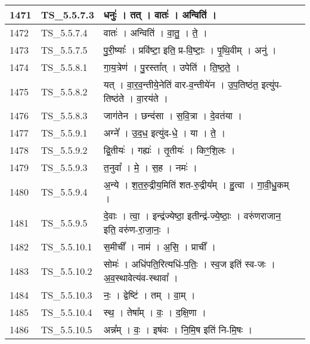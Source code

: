 \documentclass[17pt]{extarticle}
\begin{document}
\begin{longtable}{||p{0.4in}||p{0.9in}||p{4.0in}||p{0.9in}||}
        \hline
            1471 & TS\_5.5.7.3 & धनुः॑   ।   तत्   ।   वातः॑   ।   अन्विति॑   ।    &      \\
        \hline
            1472 & TS\_5.5.7.4 & वातः॑   ।   अन्विति॑   ।   वा॒तु॒   ।   ते॒   ।    &      \\
        \hline
            1473 & TS\_5.5.7.5 & पु॒री॒ष्याः᳚   ।   प्रवि॑ष्टा॒ इति॒ प्र{-}वि॒ष्टाः॒   ।   पृ॒थि॒वीम्   ।   अनु॑   ।    &      \\
        \hline
            1474 & TS\_5.5.8.1 & गा॒य॒त्रेण॑   ।   पु॒रस्ता᳚त्   ।   उपेति॑   ।   ति॒ष्ठ॒ते॒   ।    &      \\
        \hline
            1475 & TS\_5.5.8.2 & यत्   ।   वा॒र॒व॒न्तीये॒नेति॑ वार{-}व॒न्तीये॑न   ।   उ॒प॒तिष्ठ॑त॒ इत्यु॑प{-}तिष्ठ॑ते   ।   वा॒रय॑ते   ।    &      \\
        \hline
            1476 & TS\_5.5.8.3 & जाग॑तेन   ।   छन्द॑सा   ।   स॒वि॒त्रा   ।   दे॒वत॑या   ।    &      \\
        \hline
            1477 & TS\_5.5.9.1 & अग्ने᳚   ।   उ॒द॒ध॒ इत्यु॑द{-}धे॒   ।   या   ।   ते॒   ।    &      \\
        \hline
            1478 & TS\_5.5.9.2 & द्वि॒तीयः॑   ।   गह्यः॑   ।   तृ॒तीयः॑   ।   किꣳ॒॒शि॒लः   ।    &      \\
        \hline
            1479 & TS\_5.5.9.3 & त॒नुवा᳚   ।   मे॒   ।   स॒ह   ।   नमः॑   ।    &      \\
        \hline
            1480 & TS\_5.5.9.4 & अ॒न्ये   ।   श॒त॒रु॒द्रीय॒मिति॑ शत{-}रु॒द्रीय᳚म्   ।   हु॒त्वा   ।   गा॒वी॒धु॒कम्   ।    &      \\
        \hline
            1481 & TS\_5.5.9.5 & दे॒वाः   ।   त्वा॒   ।   इन्द्र॑ज्येष्ठा॒ इतीन्द्र॑{-}ज्ये॒ष्ठाः॒   ।   वरु॑णराजान॒ इति॒ वरु॑ण{-}रा॒जा॒नः॒   ।    &      \\
        \hline
            1482 & TS\_5.5.10.1 & स॒मीची᳚   ।   नाम॑   ।   अ॒सि॒   ।   प्राची᳚   ।    &      \\
        \hline
            1483 & TS\_5.5.10.2 & सोमः॑   ।   अधि॑पति॒रित्यधि॑{-}प॒तिः॒   ।   स्व॒ज इति॑ स्व{-}जः   ।   अ॒व॒स्थावेत्य॑व{-}स्थावा᳚   ।    &      \\
        \hline
            1484 & TS\_5.5.10.3 & नः॒   ।   द्वेष्टि॑   ।   तम्   ।   वा॒म्   ।    &      \\
        \hline
            1485 & TS\_5.5.10.4 & स्थ॒   ।   तेषा᳚म्   ।   वः॒   ।   द॒क्षि॒णा   ।    &      \\
        \hline
            1486 & TS\_5.5.10.5 & अन्न᳚म्   ।   वः॒   ।   इष॑वः   ।   नि॒मि॒ष इति॑ नि{-}मि॒षः   ।    &      \\

\end{longtable}
\end{document}
